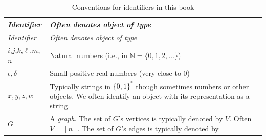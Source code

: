 \begin{longtable}[]{@{}ll@{}}
\caption{Conventions for identifiers in this book}\tabularnewline
\toprule
\begin{minipage}[b]{0.11\columnwidth}\raggedright
\emph{Identifier}\strut
\end{minipage} & \begin{minipage}[b]{0.83\columnwidth}\raggedright
\emph{Often denotes object of type}\strut
\end{minipage}\tabularnewline
\midrule
\endfirsthead
\toprule
\begin{minipage}[b]{0.11\columnwidth}\raggedright
\emph{Identifier}\strut
\end{minipage} & \begin{minipage}[b]{0.83\columnwidth}\raggedright
\emph{Often denotes object of type}\strut
\end{minipage}\tabularnewline
\midrule
\endhead
\begin{minipage}[t]{0.11\columnwidth}\raggedright
\(i\),\(j\),\(k\),\(\ell\),\(m\),\(n\)\strut
\end{minipage} & \begin{minipage}[t]{0.83\columnwidth}\raggedright
Natural numbers (i.e., in \(\mathbb{N} = \{0,1,2,\ldots \}\))\strut
\end{minipage}\tabularnewline
\begin{minipage}[t]{0.11\columnwidth}\raggedright
\(\epsilon,\delta\)\strut
\end{minipage} & \begin{minipage}[t]{0.83\columnwidth}\raggedright
Small positive real numbers (very close to \(0\))\strut
\end{minipage}\tabularnewline
\begin{minipage}[t]{0.11\columnwidth}\raggedright
\(x,y,z,w\)\strut
\end{minipage} & \begin{minipage}[t]{0.83\columnwidth}\raggedright
Typically strings in \(\{0,1\}^*\) though sometimes numbers or other
objects. We often identify an object with its representation as a
string.\strut
\end{minipage}\tabularnewline
\begin{minipage}[t]{0.11\columnwidth}\raggedright
\(G\)\strut
\end{minipage} & \begin{minipage}[t]{0.83\columnwidth}\raggedright
A \emph{graph}. The set of \(G\)'s vertices is typically denoted by
\(V\). Often \(V=[n]\). The set of \(G\)'s edges is typically denoted by

\end{minipage}
\end{longtable}
